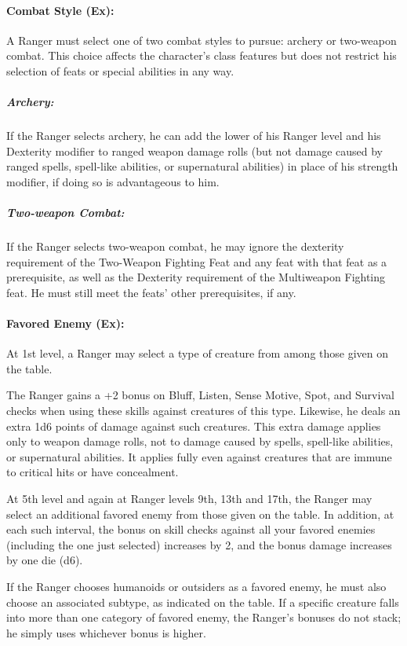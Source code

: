 \paragraph{Combat Style (Ex):}
A Ranger must select one of two combat styles to pursue: archery or two-weapon combat. This choice affects the character's class features but does not restrict his selection of feats or special abilities in any way.

\subparagraph{Archery:} If the Ranger selects archery, he can add the lower of his Ranger level and his Dexterity modifier to ranged weapon damage rolls (but not damage caused by ranged spells, spell-like abilities, or supernatural abilities) in place of his strength modifier, if doing so is advantageous to him. 

\subparagraph{Two-weapon Combat:} If the Ranger selects two-weapon combat, he may ignore the dexterity requirement of the Two-Weapon Fighting Feat and any feat with that feat as a prerequisite, as well as the Dexterity requirement of the Multiweapon Fighting feat. He must still meet the feats' other prerequisites, if any.

\paragraph{Favored Enemy (Ex):}
At 1st level, a Ranger may select a type of creature from among those given on the  table.

The Ranger gains a +2 bonus on Bluff, Listen, Sense Motive, Spot, and Survival checks when using these skills against creatures of this type. 
Likewise, he deals an extra 1d6 points of damage against such creatures. 
This extra damage applies only to weapon damage rolls, not to damage caused by spells, spell-like abilities, or supernatural abilities.
It applies fully even against creatures that are immune to critical hits or have concealment.

At 5th level and again at Ranger levels 9th, 13th and 17th, the Ranger may select an additional favored enemy from those given on the table. 
In addition, at each such interval, the bonus on skill checks against all your favored enemies (including the one just selected) increases by 2, and the bonus damage increases by one die (d6).

If the Ranger chooses humanoids or outsiders as a favored enemy, he must also choose an associated subtype, as indicated on the table. 
If a specific creature falls into more than one category of favored enemy, the Ranger's bonuses do not stack; he simply uses whichever bonus is higher.

